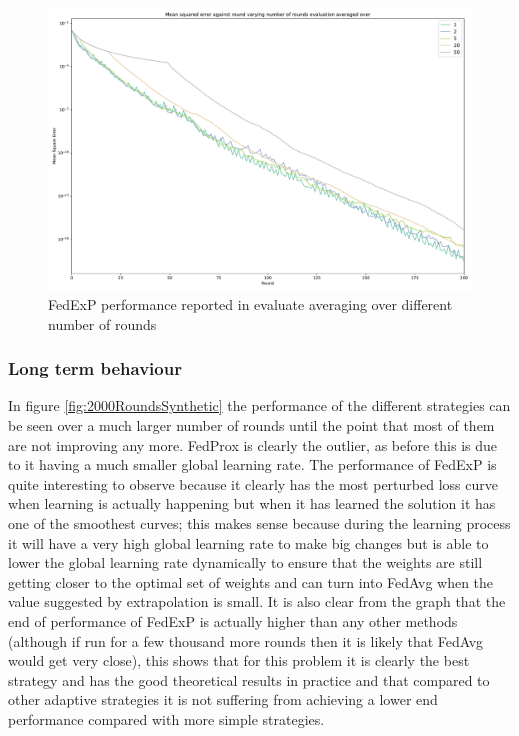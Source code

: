 \documentclass{article}
\begin{document}
\begin{figure}
    \centerline{\includegraphics[width=.6\linewidth]{figs/synthetic_numberOfRoundsAverageEvaluate.pdf}}
    \caption{FedExP performance reported in evaluate averaging over different number of rounds}
    \label{fig:differentNumberOfAverageEvaluateRoundsSynthetic}
\end{figure}

\subsubsection{Long term behaviour}

In figure \ref{fig:2000RoundsSynthetic} the performance of the different strategies can be seen over a much larger number of rounds until the point that most of them are not improving any more.  FedProx is clearly the outlier, as before this is due to it having a much smaller global learning rate.  The performance of FedExP is quite interesting to observe because it clearly has the most perturbed loss curve when learning is actually happening but when it has learned the solution it has one of the smoothest curves; this makes sense because during the learning process it will have a very high global learning rate to make big changes but is able to lower the global learning rate dynamically to ensure that the weights are still getting closer to the optimal set of weights and can turn into FedAvg when the value suggested by extrapolation is small.  It is also clear from the graph that the end of performance of FedExP is actually higher than any other methods (although if run for a few thousand more rounds then it is likely that FedAvg would get very close), this shows that for this problem it is clearly the best strategy and has the good theoretical results in practice and that compared to other adaptive strategies it is not suffering from achieving a lower end performance compared with more simple strategies.
\end{document}
